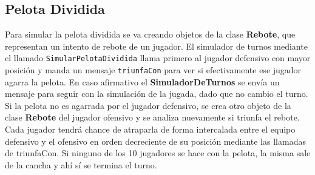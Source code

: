 \subsection{Pelota Dividida}
Para simular la pelota dividida se va creando objetos de la clase \textbf{Rebote}, que representan
un intento de rebote de un jugador. El simulador de turnos mediante el llamado 
\texttt{SimularPelotaDividida} llama primero al jugador defensivo con mayor
 posición y manda un mensaje \texttt{triunfaCon} para ver si efectivamente ese jugador 
agarra la pelota.
En caso afirmativo el \textbf{SimuladorDeTurnos} se envía un mensaje 
para seguir con la simulación de la jugada, dado que no cambio el turno.
Si la pelota no es agarrada por el jugador defensivo, se crea otro objeto de la clase \textbf{Rebote}
del jugador ofensivo y se analiza nuevamente si triunfa el rebote.
Cada jugador tendrá chance de atraparla de forma intercalada entre el equipo 
defensivo y el ofensivo en orden decreciente de su posición mediante las 
llamadas de triunfaCon.
Si ninguno de los 10 jugadores se hace con la pelota, la misma sale de la 
cancha y ahí sí se termina el turno.

